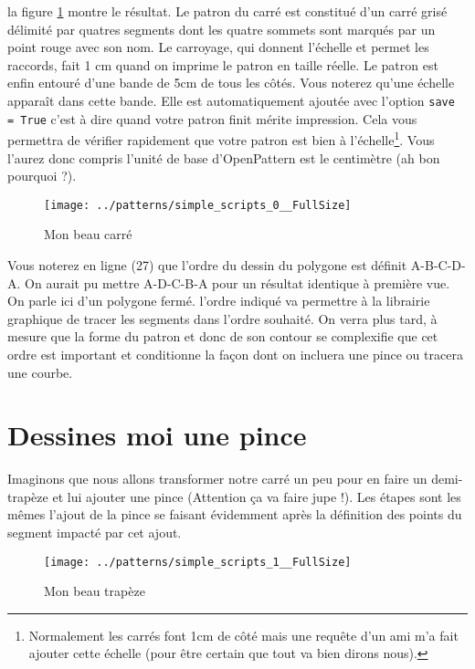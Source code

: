 \documentclass[10pt,a4paper,twoside]{report}
\begin{document}


la figure \ref{fig:carre} montre le résultat. Le patron du carré est constitué d'un carré grisé délimité par quatres segments dont les quatre sommets sont marqués par un point rouge avec son nom.  Le carroyage, qui donnent l'échelle et permet les raccords, fait 1 cm quand on imprime le patron en taille réelle. Le patron est enfin entouré d'une bande de 5cm de tous les côtés. Vous noterez qu'une échelle apparaît dans cette bande. Elle est automatiquement ajoutée avec l'option \texttt{save = True} c'est à dire quand votre patron finit mérite impression. Cela vous permettra de vérifier rapidement que votre patron est bien à l'échelle\footnote{Normalement les carrés font 1cm de côté mais une requête d'un ami m'a fait ajouter cette échelle (pour être certain que tout va bien dirons nous).}. Vous l'aurez donc compris l'unité de base d'OpenPattern est le centimètre (ah bon pourquoi ?).

\begin{figure}
\begin{center}
\texttt{[image: ../patterns/simple\_scripts\_0\_\_FullSize]}
\end{center}
\caption{Mon beau carré}
\label{fig:carre}
\end{figure}

Vous noterez en ligne (27) que l'ordre du dessin du polygone est définit A-B-C-D-A. On aurait pu mettre A-D-C-B-A pour un résultat identique à première vue. On parle ici d'un polygone fermé. l'ordre indiqué va permettre à la librairie graphique de tracer les segments dans l'ordre souhaité. On verra plus tard, à mesure que la forme du patron et donc de son contour se complexifie que cet ordre  est important et conditionne la façon dont on incluera une pince ou tracera une courbe.

\section{Dessines moi une pince}

Imaginons que nous allons transformer notre carré un peu pour en faire un demi-trapèze et lui ajouter une pince (Attention ça va faire jupe !). Les étapes sont les mêmes l'ajout de la pince se faisant évidemment après la définition des points du segment impacté par cet ajout.



\begin{figure}
\begin{center}
\texttt{[image: ../patterns/simple\_scripts\_1\_\_FullSize]}
\end{center}
\caption{Mon beau trapèze}
\label{fig:trapeze}
\end{figure}
\end{document}
